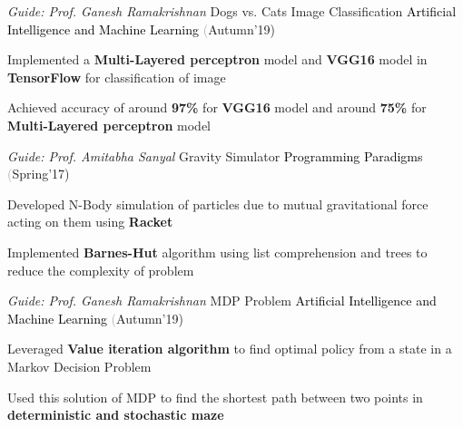 \begin{cventries}
  \cventry
    {\textit{Guide: Prof. Ganesh Ramakrishnan}}
    {Dogs vs. Cats Image Classification}
    {\textcolor{black} {Artificial Intelligence and Machine Learning}}
    {\fontsize{9pt}{1em} \textcolor{darkgray}(Autumn'19)}
    {
      \begin{cvitems}
        \item Implemented a \textbf{Multi-Layered perceptron} model and \textbf{VGG16} model in \textbf{TensorFlow} for classification of image \vspace{0.25mm}
        \item Achieved accuracy of around \textbf{97\%} for \textbf{VGG16} model and around \textbf{75\%} for \textbf{Multi-Layered perceptron} model  \vspace{-1mm}
      \end{cvitems}
    }
  \cventry
    {\textit{Guide: Prof. Amitabha Sanyal}}
    {Gravity Simulator}
    {\textcolor{black} {Programming Paradigms}}
    {\fontsize{9pt}{1em} \textcolor{darkgray}(Spring'17)}
    {
      \begin{cvitems}
        \item Developed N-Body simulation of particles due to mutual gravitational force acting on them using \textbf{Racket} \vspace{0.25mm}
        \item Implemented \textbf{Barnes-Hut} algorithm using list comprehension and trees to reduce the complexity of problem \vspace{-1mm}
      \end{cvitems}
    }
  \cventry
    {\textit{Guide: Prof. Ganesh Ramakrishnan}}
    {MDP Problem}
    {\textcolor{black} {Artificial Intelligence and Machine Learning}}
    {\fontsize{9pt}{1em} \textcolor{darkgray}(Autumn'19)}
    {
      \begin{cvitems}
        \item Leveraged \textbf{Value iteration algorithm} to find optimal policy from a state in a Markov Decision Problem\vspace{0.25mm}
        \item Used this solution of MDP to find the shortest path between two points in \textbf{deterministic and stochastic maze} \vspace{-1mm}
      \end{cvitems}
    }
\end{cventries}
